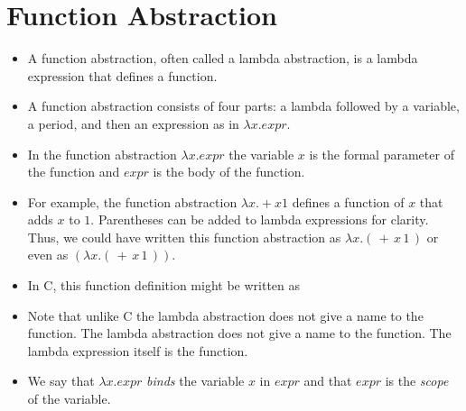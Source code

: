 \documentclass[]{article}
\begin{document}
\section{Function Abstraction}
\begin{itemize}
\item A function abstraction, often called a lambda abstraction, is a lambda
expression that defines a function.
\item A function abstraction consists of four parts: a lambda followed by a
variable, a period, and then an expression as in $\lambda x.expr$.
\item In the function abstraction $\lambda x.expr$ the variable $x$ is the
formal parameter of the function and $expr$ is the body of the function.
\item For example, the function abstraction $\lambda x.+x 1$ defines a function
of $x$ that adds $x$ to $1$. Parentheses can be added to lambda expressions for
clarity. Thus, we could have written this function abstraction as $\lambda
x.(\,+\,x\,1\,)$ or even as $(\lambda x.(\,+\,x\,1\,))$.
\item In C, this function definition might be written as

\item Note that unlike C the lambda abstraction does not give a name to the
function. The lambda abstraction does not give a name to the function. The
lambda expression itself is the function.
\item We say that $\lambda x.expr$ \emph{binds} the variable $x$ in $expr$ and
that $expr$ is the \emph{scope} of the variable.
\end{itemize}
\end{document}
